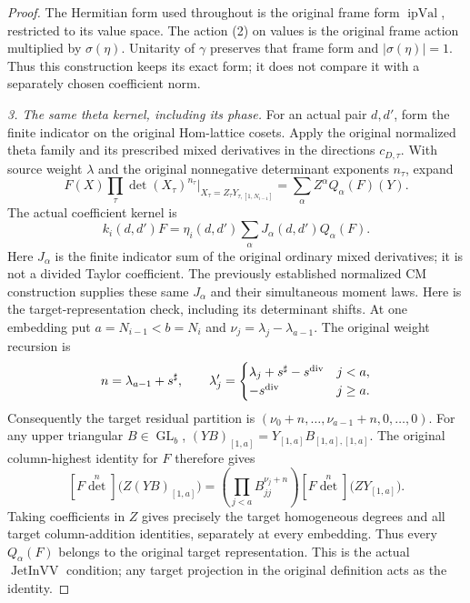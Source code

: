 \begin{proof}
The Hermitian form used throughout is the original frame form
$\operatorname{ipVal}$, restricted to its value space.
The action (2) on values is the original frame action multiplied by
$\sigma(\eta)$.  Unitarity of $\gamma$ preserves that frame form
and $|\sigma(\eta)|=1$.  Thus this construction keeps its exact form;
it does not compare it with a separately chosen coefficient norm.

\emph{3. The same theta kernel, including its phase.}
For an actual pair $d,d'$, form the finite indicator on the original
Hom-lattice cosets.  Apply the original normalized theta family and
its prescribed mixed derivatives in the directions $c_{D,\tau}$.
With source weight $\lambda$ and the original nonnegative determinant
exponents $n_\tau$, expand
\[
 F(X)\prod_\tau\det(X_\tau)^{n_\tau}
       \bigg|_{X_\tau=Z_\tau Y_{\tau,[1,N_{i-1}]}}
       =\sum_\alpha Z^\alpha Q_\alpha(F)(Y).
\]
The actual coefficient kernel is
\[
 k_i(d,d')F=\eta_i(d,d')\sum_\alpha J_\alpha(d,d')Q_\alpha(F).
                                                               \tag{3}
\]
Here $J_\alpha$ is the finite indicator sum of the original ordinary
mixed derivatives; it is not a divided Taylor coefficient.
The previously established normalized CM construction supplies these
same $J_\alpha$ and their simultaneous moment laws.  Here is the
target-representation check, including its determinant shifts.
At one embedding put $a=N_{i-1}<b=N_i$ and
$\nu_j=\lambda_j-\lambda_{a-1}$.  The original weight recursion is
\[
 n=\lambda_{a-1}+s^{\sharp},\qquad
 \lambda'_j=\begin{cases}
       \lambda_j+s^{\sharp}-s^{\rm div}&j<a,\\
       -s^{\rm div}&j\ge a.
                 \end{cases}
\]
Consequently the target residual partition is
$(\nu_0+n,\ldots,\nu_{a-1}+n,0,\ldots,0)$.
For any upper triangular $B\in\operatorname{GL}_b$,
$(YB)_{[1,a]}=Y_{[1,a]}B_{[1,a],[1,a]}$.  The original
column-highest identity for $F$ therefore gives
\[
 [F\det^n]\bigl(Z(YB)_{[1,a]}\bigr)
    =\left(\prod_{j<a}B_{jj}^{\nu_j+n}\right)
                     [F\det^n]\bigl(ZY_{[1,a]}\bigr).
\]
Taking coefficients in $Z$ gives precisely the target homogeneous
degrees and all target column-addition identities, separately at every
embedding.  Thus every $Q_\alpha(F)$ belongs to the original target
representation.  This is the actual $\operatorname{JetInVV}$ condition;
any target projection in the original definition acts as the identity.


\end{proof}
